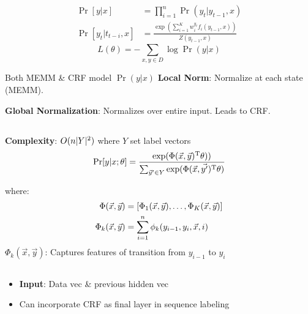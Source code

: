 \documentclass[9pt]{extarticle}
\renewcommand{\green}[1]{{\color{ForestGreen} #1}}
\newcommand{\greenbf}[1]{\textbf{\green{#1}}}
\newcommand{\redbf}[1]{\textbf{\red{#1}}}
\begin{document}
\begin{multicols}{3}
  \subsection*{}
  \begin{align*}
    \Pr[y\vert x] &= \prod_{i=1}^{n} \Pr(y_t \vert y_{t-1},x) \\
    \Pr[y_{t} \vert t_{t-i}, x] &= \frac{\exp\left(\sum_{i=1}^{K}w_{i}^{y_t}f_{i}(y_{t-1},x) \right)}{Z(y_{t-1},x)}
  \end{align*}
  \begin{equation*}
    L(\theta) = -\sum_{x,y\in D} \log \Pr(y \vert x)
  \end{equation*}

  Both MEMM \& CRF model $\Pr(y\vert x)$
  \greenbf{Local Norm}: Normalize at each state (MEMM). \redbf{Label bias}

  \greenbf{Global Normalization}: Normalizes over entire input. Leads to CRF\@.

  \subsection*{}
  \textbf{Complexity}: $O(n\lvert Y\rvert^{2})$ where $Y$ set label vectors
  \begin{equation*}
    \Pr[y \vert x; \theta] = \frac{\exp(\Phi(\vec{x},\vec{y})^{\text{T}}\theta))}{\sum_{\vec{y}' \in Y} \exp(\Phi(\vec{x}, \vec{y'})^{\text{T}}\theta)}
  \end{equation*}

  where:
  \begin{align*}
      \Phi(\vec{x},\vec{y}) &= \lbrack\Phi_{1}(\vec{x},\vec{y}),\ldots,\Phi_{K}(\vec{x},\vec{y})\rbrack \\
      \Phi_{k}(\vec{x},\vec{y}) &= \sum_{i=1}^{n} \phi_{k}(y_{i-1},y_{i},\vec{x},i)
  \end{align*}
  $\Phi_{k}(\vec{x},\vec{y})$: Captures features of transition from $y_{i-1}$ to $y_i$

  \subsection*{}

  \begin{itemize}
    \item \textbf{Input}: Data vec \& previous hidden vec
    \item Can incorporate CRF as final layer in sequence labeling
  \end{itemize}


\end{multicols}
\end{document}
